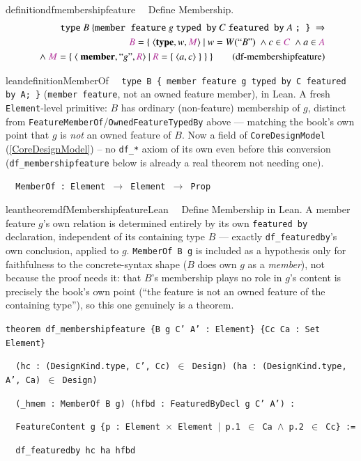 \begin{restatable}{definition}{dfmembershipfeature}~~   Define Membership.
\begin{align}
\texttt{type}~ B~\{ \texttt{member feature}~ g ~\texttt{typed by}~ C~\texttt{featured by}~A~\texttt{; \}}~\Rightarrow  \notag \\
\mc{B}=\{~\langle \textbf{type},w,\mc{M}\rangle~\vert~w=W(``B")~\wedge c \in \mc{C}~\wedge a \in \mc{A} \notag \\
~\wedge~ \mc{M}=\{~\langle~\textbf{member}, ``g",\mc{R} \rangle~\vert ~\mc{R}=\{~\langle a,c\rangle~\}~\}~\}
\label{eq:df-membershipfeature}\tag{df-membershipfeature}
\end{align}
\end{restatable}

\begin{restatable}{leandefinition}{MemberOf}~~ \texttt{type B \{ member feature g typed by C
featured by A; \}} (\texttt{member feature}, not an owned feature member), in Lean. A fresh
\texttt{Element}-level primitive: $B$ has ordinary (non-feature) membership of $g$, distinct from
\texttt{FeatureMemberOf}/\texttt{OwnedFeatureTypedBy} above --- matching the book's own point that $g$ is
\emph{not} an owned feature of $B$. Now a field of \texttt{CoreDesignModel} (\ref{CoreDesignModel}) -- no
\texttt{df\_*} axiom of its own even before this conversion (\texttt{df\_membershipfeature} below is
already a real theorem not needing one).

\texttt{~~MemberOf : Element $\to$ Element $\to$ Prop}
\label{MemberOf}
\end{restatable}

\begin{restatable}{leantheorem}{dfMembershipfeatureLean}~~ Define Membership
in Lean. A member feature $g$'s own relation is determined entirely by its own \texttt{featured by}
declaration, independent of its containing type $B$ --- exactly \texttt{df\_featuredby}'s own conclusion,
applied to $g$. \texttt{MemberOf B g} is included as a hypothesis only for faithfulness to the concrete-syntax
shape ($B$ does own $g$ as a \emph{member}), not because the proof needs it: that $B$'s membership plays no
role in $g$'s content is precisely the book's own point (``the feature is not an owned feature of the
containing type''), so this one genuinely is a theorem.

\texttt{\textcolor{leancolor}{theorem} \textcolor{leanyellow}{df\_membershipfeature} \{B g C' A' : Element\} \{Cc Ca : Set Element\}}

\texttt{~~(hc : (DesignKind.type, C', Cc) $\in$ Design) (ha : (DesignKind.type, A', Ca) $\in$ Design)}

\texttt{~~(\_hmem : MemberOf B g) (hfbd : FeaturedByDecl g C' A') :}

\texttt{~~FeatureContent g \{p : Element $\times$ Element $\vert$ p.1 $\in$ Ca $\wedge$ p.2 $\in$ Cc\} :=}

\texttt{~~df\_featuredby hc ha hfbd}
\label{df_membershipfeature}
\end{restatable}

